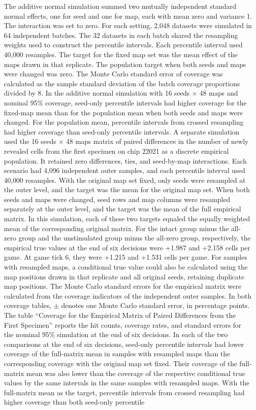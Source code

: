 \documentclass{article}
\begin{document}
The additive normal simulation summed two mutually independent standard normal effects, one for seed and one for map, each with mean zero and variance 1. The interaction was set to zero. For each setting, 2,048 datasets were simulated in 64 independent batches. The 32 datasets in each batch shared the resampling weights used to construct the percentile intervals. Each percentile interval used 40,000 resamples. The target for the fixed map set was the mean effect of the maps drawn in that replicate. The population target when both seeds and maps were changed was zero. The Monte Carlo standard error of coverage was calculated as the sample standard deviation of the batch coverage proportions divided by 8. In the additive normal simulation with 16 seeds \ensuremath{\times} 48 maps and nominal 95\% coverage, seed-only percentile intervals had higher coverage for the fixed-map mean than for the population mean when both seeds and maps were changed. For the population mean, percentile intervals from crossed resampling had higher coverage than seed-only percentile intervals. A separate simulation used the 16 seeds \ensuremath{\times} 48 maps matrix of paired differences in the number of newly revealed cells from the first specimen on chip 22021 as a discrete empirical population. It retained zero differences, ties, and seed-by-map interactions. Each scenario had 4,096 independent outer samples, and each percentile interval used 40,000 resamples. With the original map set fixed, only seeds were resampled at the outer level, and the target was the mean for the original map set. When both seeds and maps were changed, seed rows and map columns were resampled separately at the outer level, and the target was the mean of the full empirical matrix. In this simulation, each of these two targets equaled the equally weighted mean of the corresponding original matrix. For the intact group minus the all-zero group and the unstimulated group minus the all-zero group, respectively, the empirical true values at the end of six decisions were +1.987 and +2.158 cells per game. At game tick 6, they were +1.215 and +1.531 cells per game. For samples with resampled maps, a conditional true value could also be calculated using the map positions drawn in that replicate and all original seeds, retaining duplicate map positions. The Monte Carlo standard errors for the empirical matrix were calculated from the coverage indicators of the independent outer samples. In both coverage tables, \ensuremath{\pm} denotes one Monte Carlo standard error, in percentage points. The table “Coverage for the Empirical Matrix of Paired Differences from the First Specimen” reports the hit counts, coverage rates, and standard errors for the nominal 95\% simulation at the end of six decisions. In each of the two comparisons at the end of six decisions, seed-only percentile intervals had lower coverage of the full-matrix mean in samples with resampled maps than the corresponding coverage with the original map set fixed. Their coverage of the full-matrix mean was also lower than the coverage of the respective conditional true values by the same intervals in the same samples with resampled maps. With the full-matrix mean as the target, percentile intervals from crossed resampling had higher coverage than both seed-only percentile 
\end{document}
